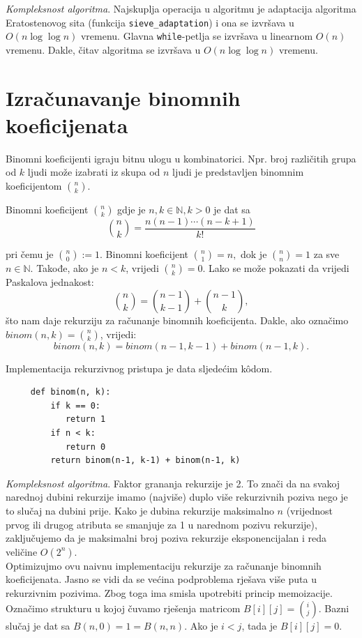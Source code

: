 \textit{Kompleksnost algoritma}. Najskuplja operacija u algoritmu je ada\-ptacija algoritma Eratostenovog sita (funkcija \texttt{sieve\_adaptation}) i ona se izvršava u $O(n \log \log n)$ vremenu. Glavna \texttt{while}-petlja se izvršava u linearnom $O(n)$ vremenu. Dakle, čitav algoritma se izvršava u 
 $O(n \log \log n)$ vremenu.
 
  \section{Izračunavanje binomnih koeficijenata} 
  
  Binomni koeficijenti igraju bitnu ulogu u kombinatorici. Npr. broj različitih grupa od $k$ ljudi može izabrati iz skupa od $n$ ljudi je predstavljen binomnim koeficijentom $\binom{n}{k}$. 
  
  \begin{definition}
  	 Binomni koeficijent $\binom{n}{k}$ gdje je $n, k \in \mathbb{N}, k > 0$  je dat sa 
  	 $$\binom{n}{k} = \frac{n(n-1) \cdots (n-k+1)}{k!}$$
  \end{definition}
  
pri čemu je $\binom{n}{0} := 1$. Binomni koeficijent $\binom{n}{1} = n,$ dok je $\binom{n}{n} = 1$ za sve $n \in \mathbb{N}.$ Takođe, ako je $n <k$, vrijedi $\binom{n}{k}=0$.   Lako se može pokazati da vrijedi Paskalova jednakost:
  $$ \binom{n}{k} = \binom{n-1}{k-1} + \binom{n-1}{k},$$
   što nam daje rekurziju za računanje binomnih koeficijenta. Dakle, ako označimo $binom(n, k) = \binom{n}{k}$, vrijedi:
   $$ binom(n, k)= binom(n-1, k-1) + binom(n-1, k).$$
   
   Implementacija rekurzivnog pristupa je data sljedećim k\^odom.
   
   \begin{verbatim}
     def binom(n, k): 
         if k == 0:
            return 1
         if n < k:
            return 0
         return binom(n-1, k-1) + binom(n-1, k)
   \end{verbatim}
  \textit{Kompleksnost algoritma}. Faktor grananja rekurzije je 2. To znači da na svakoj narednoj dubini rekurzije imamo (najviše) duplo više rekurzivnih poziva nego je to slučaj na dubini prije.  Kako je dubina rekurzije maksimalno $n$ (vrijednost prvog ili drugog atributa se smanjuje za 1 u narednom pozivu rekurzije), zaključujemo da je maksimalni broj poziva rekurzije eksponenci\-jalan i reda veličine $O(2^n)$. \\
  
  Optimizujmo ovu naivnu implementaciju rekurzije za računanje binomnih koeficijenata.  Jasno se vidi da se većina podproblema rješava više puta u rekurzivnim pozivima. Zbog toga ima smisla upotrebiti princip memoizacije. Označimo strukturu u kojoj čuvamo rješenja matricom $B[i][j]= \binom{i}{j}$. Bazni slučaj je  dat sa $B(n, 0) = 1 = B(n,n)$. Ako je $i < j$, tada je $B[i][j] = 0$. 
  
